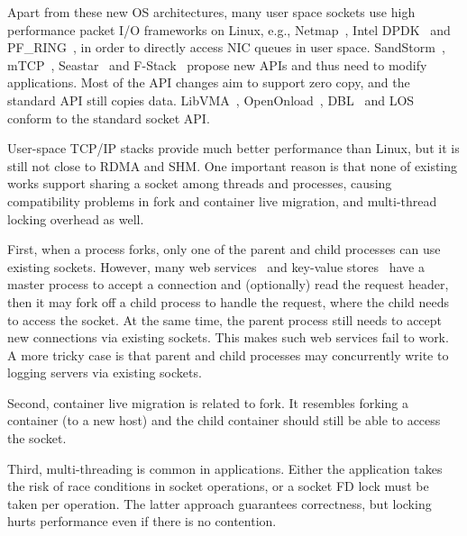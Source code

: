 Apart from these new OS architectures, many user space sockets use high performance packet I/O frameworks on Linux, e.g., Netmap~\cite{rizzo2012netmap}, Intel DPDK~\cite{dpdk} and PF\_RING~\cite{pf-ring}, in order to directly access NIC queues in user space.
SandStorm~\cite{marinos2014network}, mTCP~\cite{jeong2014mtcp}, Seastar~\cite{seastar} and F-Stack~\cite{fstack} propose new APIs and thus need to modify applications.
Most of the API changes aim to support zero copy, and the standard API still copies data.
LibVMA~\cite{libvma}, OpenOnload~\cite{openonload}, DBL~\cite{dbl} and LOS~\cite{huang2017high} conform to the standard socket API.

User-space TCP/IP stacks provide much better performance than Linux, but it is still not close to RDMA and SHM.
One important reason is that none of existing works support sharing a socket among threads and processes, causing compatibility problems in fork and container live migration, and multi-thread locking overhead as well.

First, when a process forks, only one of the parent and child processes can use existing sockets.
However, many web services~\cite{apache,nginx,php-fpm,python-gunicorn,vsftpd} and key-value stores~\cite{memcached} have a master process to accept a connection and (optionally) read the request header, then it may fork off a child process to handle the request, where the child needs to access the socket.
At the same time, the parent process still needs to accept new connections via existing sockets.
This makes such web services fail to work.
A more tricky case is that parent and child processes may concurrently write to logging servers via existing sockets.

Second, container live migration is related to fork.
It resembles forking a container (to a new host) and the child container should still be able to access the socket.

Third, multi-threading is common in applications.
Either the application takes the risk of race conditions in socket operations, or a socket FD lock must be taken per operation.
The latter approach guarantees correctness, but locking hurts performance even if there is no contention.


